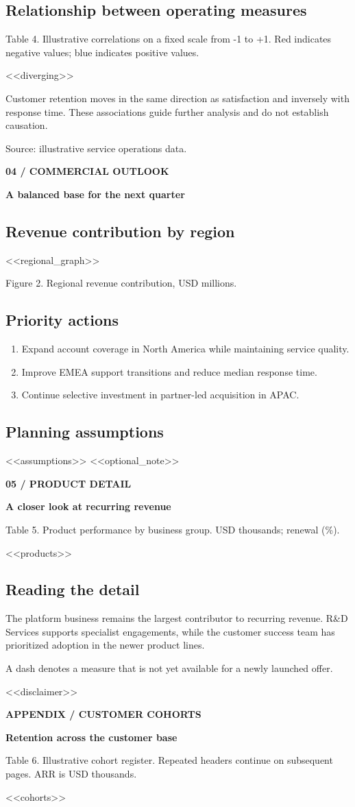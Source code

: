 \documentclass[10pt]{article}
\newcommand{\eyebrow}[1]{{\small\bfseries\color{teal}#1}\par}
\newcommand{\pagetitle}[2]{\eyebrow{#1}{\fontsize{25}{30}\selectfont\bfseries #2}\par\vspace{7pt}}
\newcommand{\note}[1]{\par{\footnotesize\color{muted}#1}\par}
\begin{document}
\subsection*{Relationship between operating measures}
\note{Table 4. Illustrative correlations on a fixed scale from -1 to +1. Red indicates negative values; blue indicates positive values.}
\begin{center}\small <<diverging>>\end{center}
Customer retention moves in the same direction as satisfaction and inversely
with response time. These associations guide further analysis and do not establish causation.
\note{Source: illustrative service operations data.}

\newpage
\pagetitle{04 / COMMERCIAL OUTLOOK}{A balanced base for the next quarter}
\subsection*{Revenue contribution by region}
\begin{center}<<regional_graph>>\end{center}
\note{Figure 2. Regional revenue contribution, USD millions.}
\subsection*{Priority actions}
\begin{enumerate}
\item Expand account coverage in North America while maintaining service quality.
\item Improve EMEA support transitions and reduce median response time.
\item Continue selective investment in partner-led acquisition in APAC.
\end{enumerate}
\subsection*{Planning assumptions}
<<assumptions>>
<<optional_note>>

\newpage
\pagetitle{05 / PRODUCT DETAIL}{A closer look at recurring revenue}
\note{Table 5. Product performance by business group. USD thousands; renewal (\%).}
\begin{center}\small <<products>>\end{center}
\subsection*{Reading the detail}
The platform business remains the largest contributor to recurring revenue.
R\&D Services supports specialist engagements, while the customer success team
has prioritized adoption in the newer product lines.
\note{A dash denotes a measure that is not yet available for a newly launched offer.}
\vfill
\note{<<disclaimer>>}

\newpage
\pagetitle{APPENDIX / CUSTOMER COHORTS}{Retention across the customer base}
\note{Table 6. Illustrative cohort register. Repeated headers continue on subsequent pages. ARR is USD thousands.}
{\small <<cohorts>>}
\end{document}
